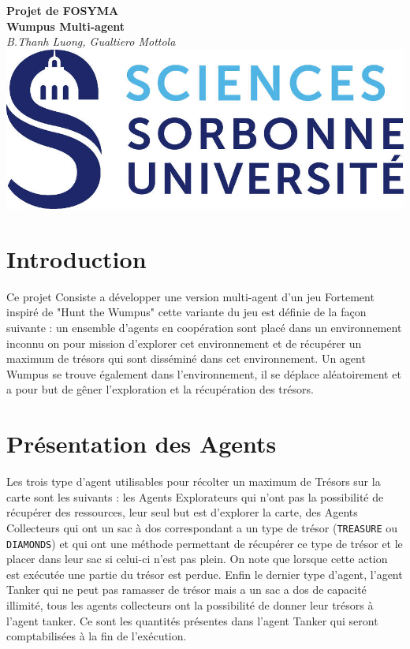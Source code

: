 \documentclass[10pt]{article}
\begin{document}
\begin{center}
	\textbf{\huge Projet de FOSYMA\\[.5cm] Wumpus Multi-agent}\\[.5cm]
	\vspace{1.5cm}
	\textit{\Large B.Thanh Luong, Gualtiero Mottola}\\
	\vspace{1.5cm}
	\includegraphics{logo}
	\vspace{1.5cm}
	\tableofcontents
\end{center}

\newpage

\section{Introduction}
	Ce projet Consiste a développer une version multi-agent d'un jeu Fortement inspiré de "Hunt the Wumpus"  cette variante du jeu est définie de la façon suivante : un ensemble d'agents en coopération sont placé dans un environnement inconnu on pour mission d'explorer cet environnement et de récupérer un maximum de trésors qui sont disséminé dans cet environnement. Un agent Wumpus se trouve également dans l'environnement, il se déplace aléatoirement et a pour but de gêner l'exploration et la récupération des trésors.
	
\section{Présentation des Agents}
	Les trois type d'agent utilisables pour récolter un maximum de Trésors sur la carte sont les suivants : les Agents Explorateurs qui n'ont pas la possibilité de récupérer des ressources, leur seul but est d'explorer la carte, des Agents Collecteurs qui ont un sac à dos correspondant a un type de trésor (\texttt{TREASURE} ou \texttt{DIAMONDS}) et qui ont une méthode permettant de récupérer ce type de trésor et le placer dans leur sac si celui-ci n'est pas plein. On note que lorsque cette action est exécutée une partie du trésor est perdue. Enfin le dernier type d'agent, l'agent Tanker qui ne peut pas ramasser de trésor mais a un sac a dos de capacité illimité, tous les agents collecteurs ont la possibilité de donner leur trésors à l'agent tanker. Ce sont les quantités présentes dans l'agent Tanker qui seront comptabilisées à la fin de l'exécution.
\end{document}
